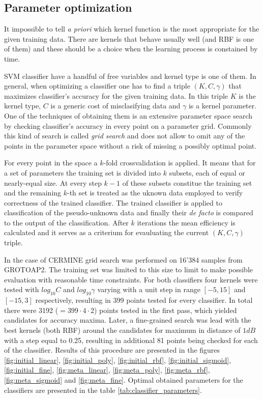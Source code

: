 \subsection{Parameter optimization}
\label{sec:svm_optimization}
It impossible to tell \textit{a priori} which kernel function is the most appropriate for the given training data. There are kernels that behave usually well (and RBF is one of them) and these should be a choice when the learning process is constained by time.

SVM classifier have a handful of free variables and kernel type is one of them. In general, when optimizing a classifier one has to find a triple $(K, C, \gamma)$ that maximizes classifier's accuracy for the given training data. In this triple $K$ is the kernel type, $C$ is a generic cost of misclasifying data and $\gamma$ is a kernel parameter. One of the techniques of obtaining them is an extensive parameter space search by checking classifier's accuracy in every point on a parameter grid. Commonly this kind of search is called \textit{grid search} and does not allow to omit any of the points in the parameter space without a risk of missing a possibly optimal point.

For every point in the space a $k$-fold crossvalidation is applied. It means that for a set of parameters the training set is divided into $k$ subsets, each of equal or nearly-equal size. At every step $k-1$ of these subsets constitue the training set and the remaining $k$-th set is treated as the uknown data employed to verify correctness of the trained classifier. The trained classifier is applied to classification of the pseudo-unknown data and finally their \textit{de facto} is compared to the output of the classification. After $k$ iterations the mean efficiency is calculated and it serves as a criterium for evauluating the current $(K, C, \gamma)$ triple.


In the case of CERMINE grid search was performed on 16'384 samples from GROTOAP2. The training set was limited to this size to limit to make possible evaluation with reasonable time constraints. For both classifiers four kernels were tested with $log_{10}C$ and $log_{10}\gamma$ varying with a unit step in range $[-5,15]$ and $[-15,3]$ respectively, resulting in 399 points tested for every classifier. In total there were 3192 ($=399\cdot4\cdot2$) points tested in the first pass, which yielded candidates for accuracy maxima. Later, a fine-grained search was lead with the best kernels (both RBF) around the candidates for maximum in distance of $1dB$ with a step equal to 0.25, resulting in additional 81 points being checked for each of the classifier. Results of this procedure are presented in the figures \ref{fig:initial_linear}, \ref{fig:initial_poly}, \ref{fig:initial_rbf}, \ref{fig:initial_sigmoid}, \ref{fig:initial_fine}, \ref{fig:meta_linear}, \ref{fig:meta_poly}, \ref{fig:meta_rbf}, \ref{fig:meta_sigmoid} and \ref{fig:meta_fine}. Optimal obtained parameters for the classifiers are presented in the table \ref{tab:classifier_parameters}.

